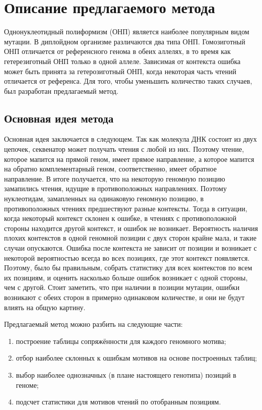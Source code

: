 \chapter{Описание предлагаемого метода} 
\label{chapter2}

	Однонуклеотидный полиформизм (ОНП) является наиболее популярным видом мутации. В диплойдном организме различаются два типа ОНП. Гомозиготный ОНП отличается от референсного генома в обеих аллелях, в то время как гетерезиготный ОНП только в одной аллеле. Зависимая от контекста ошибка может быть принята за гетерозиготный ОНП, когда некоторая часть чтений отличается от референса. Для того, чтобы уменьшить количество таких случаев, был разработан предлагаемый метод.

\section {Основная идея метода}

	Основная идея заключается в следующем. Так как молекула ДНК состоит из двух цепочек, секвенатор может получать чтения с любой из них. Поэтому чтение, которое мапится на прямой геном, имеет прямое направление, а которое мапится на обратно комплементарный геном, соответственно, имеет обратное направление. В итоге получается, что на некоторую геномную позицию замапились чтения, идущие в противоположных направлениях. Поэтому нуклеотидам, замапленных на одинаковую геномную позицию, в противоположных чтениях предшествуют разные контексты. Тогда в ситуации, когда некоторый контекст склонен к ошибке, в чтениях с противоположной стороны находится другой контекст, и ошибок не возникает. Вероятность наличия плохих контекстов в одной геномной позиции с двух сторон крайне мала, и такие случаи опускаются. Ошибка после контекста не зависит от позиции и возникает с некоторой вероятностью всегда во всех позициях, где этот контекст появляется. Поэтому, было бы правильным, собрать статистику для всех контекстов по всем их позициям, и оценить насколько больше ошибок возникает с одной стороны, чем с другой. Стоит заметить, что при наличии в позиции мутации, ошибки возникают с обеих сторон в примерно одинаковом количестве, и они не будут влиять на общую картину.

	Предлагаемый метод можно разбить на следующие части:
	\begin{enumerate}
	\item построение таблицы сопряжённости для каждого геномного мотива;
	\item отбор наиболее склонных к ошибкам мотивов на основе построенных таблиц;
	\item выбор наиболее однозначных (в плане настоящего генотипа) позиций в геноме;
	\item подсчет статистики для мотивов чтений по отобранным позициям.
	\end{enumerate}

